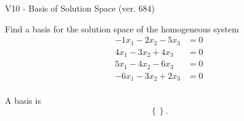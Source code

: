 \begin{exercise}
  \begin{exerciseTitle}V10 - Basis of Solution Space (ver. 684)\end{exerciseTitle}
  \begin{exerciseStatement}
    Find a basis for the solution space of the homogeneous system 
\begin{align*}
 -1 x_ 1 -2 x_ 2 -5 x_ 3 &= 0  \\ 
  4 x_ 1 -3 x_ 2 + 4 x_ 3 &= 0  \\ 
  5 x_ 1 -4 x_ 2 -6 x_ 3 &= 0  \\ 
  -6 x_ 1 -3 x_ 2 + 2 x_ 3 &= 0  \\ 
 \end{align*}


 
  \end{exerciseStatement}

  \begin{exerciseAnswer}
   A basis is   
\[\left\{\right\}.\]

  


  \end{exerciseAnswer}
\end{exercise}
